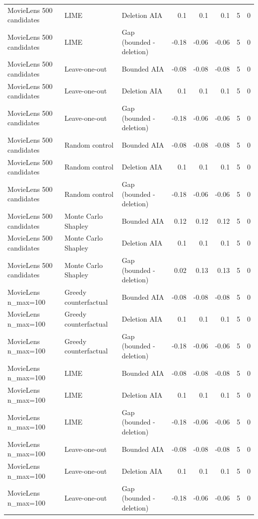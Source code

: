 \begin{table}[t]
{\begin{tabular}{lllrrrrr}
MovieLens 500 candidates & LIME & Deletion AIA & 0.1 & 0.1 & 0.1 & 5 & 0 \\
MovieLens 500 candidates & LIME & Gap (bounded - deletion) & -0.18 & -0.06 & -0.06 & 5 & 0 \\
MovieLens 500 candidates & Leave-one-out & Bounded AIA & -0.08 & -0.08 & -0.08 & 5 & 0 \\
MovieLens 500 candidates & Leave-one-out & Deletion AIA & 0.1 & 0.1 & 0.1 & 5 & 0 \\
MovieLens 500 candidates & Leave-one-out & Gap (bounded - deletion) & -0.18 & -0.06 & -0.06 & 5 & 0 \\
MovieLens 500 candidates & Random control & Bounded AIA & -0.08 & -0.08 & -0.08 & 5 & 0 \\
MovieLens 500 candidates & Random control & Deletion AIA & 0.1 & 0.1 & 0.1 & 5 & 0 \\
MovieLens 500 candidates & Random control & Gap (bounded - deletion) & -0.18 & -0.06 & -0.06 & 5 & 0 \\
MovieLens 500 candidates & Monte Carlo Shapley & Bounded AIA & 0.12 & 0.12 & 0.12 & 5 & 0 \\
MovieLens 500 candidates & Monte Carlo Shapley & Deletion AIA & 0.1 & 0.1 & 0.1 & 5 & 0 \\
MovieLens 500 candidates & Monte Carlo Shapley & Gap (bounded - deletion) & 0.02 & 0.13 & 0.13 & 5 & 0 \\
MovieLens n\_max=100 & Greedy counterfactual & Bounded AIA & -0.08 & -0.08 & -0.08 & 5 & 0 \\
MovieLens n\_max=100 & Greedy counterfactual & Deletion AIA & 0.1 & 0.1 & 0.1 & 5 & 0 \\
MovieLens n\_max=100 & Greedy counterfactual & Gap (bounded - deletion) & -0.18 & -0.06 & -0.06 & 5 & 0 \\
MovieLens n\_max=100 & LIME & Bounded AIA & -0.08 & -0.08 & -0.08 & 5 & 0 \\
MovieLens n\_max=100 & LIME & Deletion AIA & 0.1 & 0.1 & 0.1 & 5 & 0 \\
MovieLens n\_max=100 & LIME & Gap (bounded - deletion) & -0.18 & -0.06 & -0.06 & 5 & 0 \\
MovieLens n\_max=100 & Leave-one-out & Bounded AIA & -0.08 & -0.08 & -0.08 & 5 & 0 \\
MovieLens n\_max=100 & Leave-one-out & Deletion AIA & 0.1 & 0.1 & 0.1 & 5 & 0 \\
MovieLens n\_max=100 & Leave-one-out & Gap (bounded - deletion) & -0.18 & -0.06 & -0.06 & 5 & 0 \\

\end{tabular}}
\end{table}
